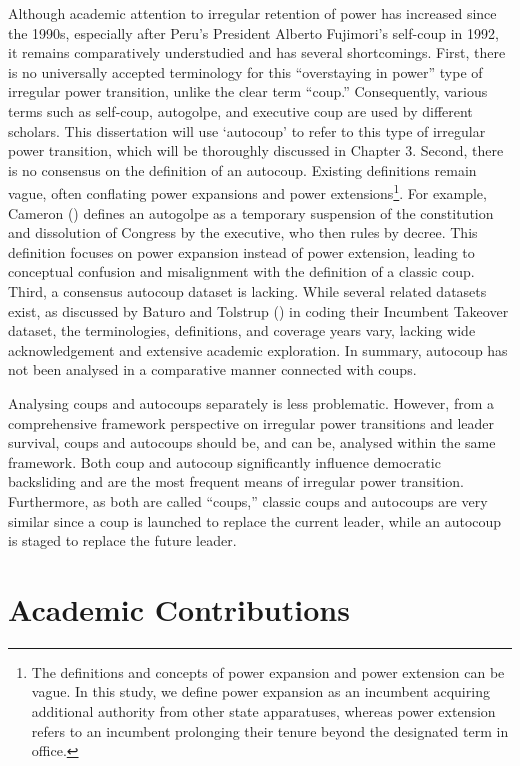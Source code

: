 \documentclass[
  12pt,
]{report}
\begin{document}
Although academic attention to irregular retention of power has
increased since the 1990s, especially after Peru's President Alberto
Fujimori's self-coup in 1992, it remains comparatively understudied and
has several shortcomings. First, there is no universally accepted
terminology for this ``overstaying in power'' type of irregular power
transition, unlike the clear term ``coup.'' Consequently, various terms
such as self-coup, autogolpe, and executive coup are used by different
scholars. This dissertation will use `autocoup' to refer to this type of
irregular power transition, which will be thoroughly discussed in
Chapter 3. Second, there is no consensus on the definition of an
autocoup. Existing definitions remain vague, often conflating power
expansions and power extensions\footnote{The definitions and concepts of
  power expansion and power extension can be vague. In this study, we
  define power expansion as an incumbent acquiring additional authority
  from other state apparatuses, whereas power extension refers to an
  incumbent prolonging their tenure beyond the designated term in
  office.}. For example, Cameron ()
defines an autogolpe as a temporary suspension of the constitution and
dissolution of Congress by the executive, who then rules by decree. This
definition focuses on power expansion instead of power extension,
leading to conceptual confusion and misalignment with the definition of
a classic coup. Third, a consensus autocoup dataset is lacking. While
several related datasets exist, as discussed by Baturo and Tolstrup
() in coding their Incumbent Takeover
dataset, the terminologies, definitions, and coverage years vary,
lacking wide acknowledgement and extensive academic exploration. In
summary, autocoup has not been analysed in a comparative manner
connected with coups.

Analysing coups and autocoups separately is less problematic. However,
from a comprehensive framework perspective on irregular power
transitions and leader survival, coups and autocoups should be, and can
be, analysed within the same framework. Both coup and autocoup
significantly influence democratic backsliding and are the most frequent
means of irregular power transition. Furthermore, as both are called
``coups,'' classic coups and autocoups are very similar since a coup is
launched to replace the current leader, while an autocoup is staged to
replace the future leader.

\section{Academic Contributions}\label{academic-contributions}
\end{document}
